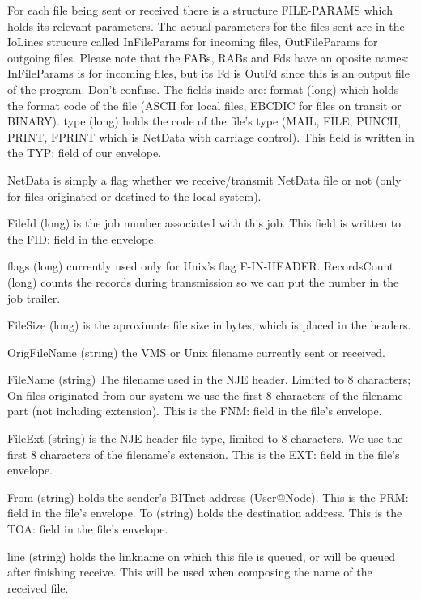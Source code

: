 
For each file being sent or received there is a structure FILE-PARAMS
which holds its relevant parameters. The actual parameters for the files
sent are in the IoLines strucure called InFileParams for incoming files,
OutFileParams  for  outgoing  files. Please note that the FABs, RABs and
Fds have an oposite names: InFileParams is for incoming files,  but  its
Fd is OutFd since this is an output file of the program. Don't confuse.
The  fields  inside are: format (long) which holds the format code of
the file (ASCII for local files, EBCDIC for files on transit or BINARY).
type (long) holds the code of the file's type (MAIL, FILE, PUNCH, PRINT,
FPRINT which is NetData with carriage control). This field is written in
the TYP: field of our envelope.

NetData is simply a flag whether we receive/transmit NetData file or not
(only for files originated or destined to the local system).

FileId (long) is the job number associated with this job. This field  is
written to the FID: field in the envelope.

flags (long) currently used only for Unix's flag F-IN-HEADER.
RecordsCount (long) counts the records during transmission so we can put
the number in the job trailer.

FileSize (long) is the aproximate file size in bytes, which is placed in
the headers.

OrigFileName  (string)  the  VMS  or  Unix  filename  currently  sent or
received.

FileName (string) The filename used in the  NJE  header.  Limited  to  8
characters;  On  files  originated  from  our  system we use the first 8
characters of the filename part (not including extension). This  is  the
FNM: field in the file's envelope.

FileExt  (string)  is the NJE header file type, limited to 8 characters.
We use the first 8 characters of the filename's extension. This  is  the
EXT: field in the file's envelope.

From (string) holds the sender's BITnet address (User@Node). This is the
FRM: field in the file's envelope.
To (string) holds the destination address. This is the TOA: field in the
file's envelope.

line  (string)  holds the linkname on which this file is queued, or will
be queued after finishing receive. This will be used when composing  the
name of the received file.

